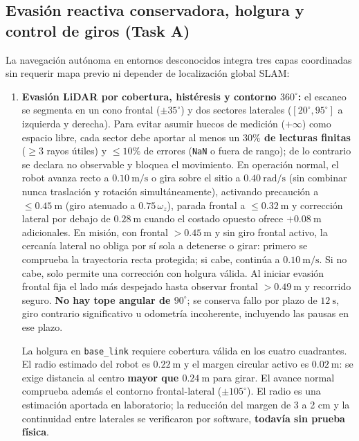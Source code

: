 \documentclass[11pt,a4paper]{article}
\begin{document}
\subsection{Evasión reactiva conservadora, holgura y control de giros (Task A)}

La navegación autónoma en entornos desconocidos integra tres capas coordinadas
sin requerir mapa previo ni depender de localización global SLAM:

\begin{enumerate}
  \item \textbf{Evasión LiDAR por cobertura, histéresis y contorno $360^\circ$:}
  el escaneo se segmenta en un cono frontal ($\pm 35^\circ$) y dos sectores
  laterales ($[20^\circ, 95^\circ]$ a izquierda y derecha). Para evitar asumir
  huecos de medición ($+\infty$) como espacio libre, cada sector debe aportar al
  menos un \textbf{$30\%$ de lecturas finitas} ($\ge 3$ rayos útiles) y
  $\le 10\%$ de errores (\texttt{NaN} o fuera de rango); de lo contrario se
  declara no observable y bloquea el movimiento. En operación normal, el robot
  avanza recto a $0.10\ \mathrm{m/s}$ o gira sobre el sitio a $0.40\ \mathrm{rad/s}$
  (sin combinar nunca traslación y rotación simultáneamente), activando
  precaución a $\le 0.45\ \mathrm{m}$ (giro atenuado a $0.75\,\omega_z$), parada
  frontal a $\le 0.32\ \mathrm{m}$ y corrección lateral por debajo de
  $0.28\ \mathrm{m}$ cuando el costado opuesto ofrece $+0.08\ \mathrm{m}$
  adicionales. En misión, con frontal $>0.45\ \mathrm{m}$ y sin giro frontal
  activo, la cercanía lateral no obliga por sí sola a detenerse o girar: primero
  se comprueba la trayectoria recta protegida; si cabe, continúa a
  $0.10\ \mathrm{m/s}$. Si no cabe, solo permite una corrección con holgura válida.
  Al iniciar evasión frontal fija el lado más despejado hasta observar frontal
  $>0.49\ \mathrm{m}$ y recorrido seguro. \textbf{No hay tope angular de
  $90^\circ$}; se conserva fallo por plazo de $12\ \mathrm{s}$, giro contrario
  significativo u odometría incoherente, incluyendo las pausas en ese plazo.

  La holgura en \texttt{base\_link} requiere cobertura válida en los cuatro
  cuadrantes. El radio estimado del robot es $0.22\ \mathrm{m}$ y el margen
  circular activo es $0.02\ \mathrm{m}$: se exige distancia al centro
  \textbf{mayor que $0.24\ \mathrm{m}$} para girar. El avance normal comprueba
  además el contorno frontal-lateral ($\pm105^\circ$). El radio es una estimación
  aportada en laboratorio; la reducción del margen de 3 a 2 cm y la continuidad
  entre laterales se verificaron por software, \textbf{todavía sin prueba física}.



\end{enumerate}
\end{document}
